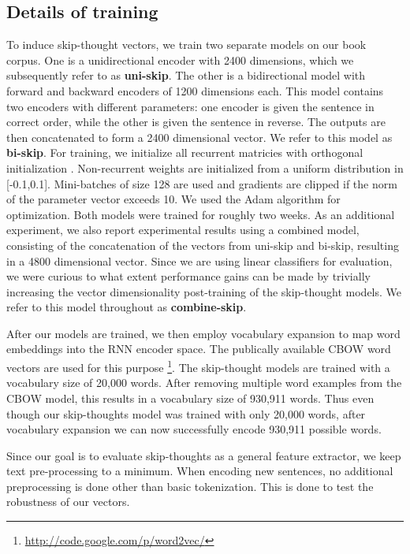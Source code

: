 \documentclass{article} \usepackage{nips15submit_e,times}
\begin{document}
\subsection{Details of training}

To induce skip-thought vectors, we train two separate models on our book corpus. One is a unidirectional encoder with 2400 dimensions, which we subsequently refer to as {\bf uni-skip}. The other is a bidirectional model with forward and backward encoders of 1200 dimensions each. This model contains two encoders with different parameters: one encoder is given the sentence in correct order, while the other is given the sentence in reverse. The outputs are then concatenated to form a 2400 dimensional vector. We refer to this model as {\bf bi-skip}. For training, we initialize all recurrent matricies with orthogonal initialization \cite{saxe2013exact}. Non-recurrent weights are initialized from a uniform distribution in [-0.1,0.1]. Mini-batches of size 128 are used and gradients are clipped if the norm of the parameter vector exceeds 10. We used the Adam algorithm \cite{kingma2014adam} for optimization. Both models were trained for roughly two weeks. As an additional experiment, we also report experimental results using a combined model, consisting of the concatenation of the vectors from uni-skip and bi-skip, resulting in a 4800 dimensional vector. Since we are using linear classifiers for evaluation, we were curious to what extent performance gains can be made by trivially increasing the vector dimensionality post-training of the skip-thought models. We refer to this model throughout as {\bf combine-skip}.

After our models are trained, we then employ vocabulary expansion to map word embeddings into the RNN encoder space. The publically available CBOW word vectors are used for this purpose \footnote{\url{http://code.google.com/p/word2vec/}}. The skip-thought models are trained with a vocabulary size of 20,000 words. After removing multiple word examples from the CBOW model, this results in a vocabulary size of 930,911 words. Thus even though our skip-thoughts model was trained with only 20,000 words, after vocabulary expansion we can now successfully encode 930,911 possible words.

Since our goal is to evaluate skip-thoughts as a general feature extractor, we keep text pre-processing to a minimum. When encoding new sentences, no additional preprocessing is done other than basic tokenization. This is done to test the robustness of our vectors.
\end{document}
